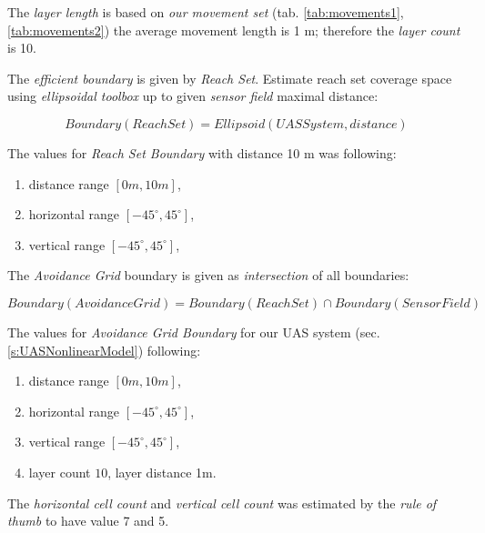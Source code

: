 \noindent The \emph{layer length} is based on \emph{our movement set} (tab. \ref{tab:movements1}, \ref{tab:movements2}) the average movement length is 1 m; therefore the \emph{layer count} is 10.

\noindent The \emph{efficient boundary} is given by  \emph{Reach Set}. Estimate reach set coverage space using \emph{ellipsoidal toolbox} \cite{kurzhanskiy2006ellipsoidal} up to given \emph{sensor field} maximal distance:

\begin{equation}
    Boundary(Reach Set) = Ellipsoid(UAS System,distance)
\end{equation}

The values for \emph{Reach Set Boundary} with distance 10 m was following:
\begin{enumerate}
    \item distance range $[0m,10m]$,
    \item horizontal range $[-45^\circ,45^\circ]$,
    \item vertical range $[-45^\circ,45^\circ]$,
\end{enumerate}

\noindent The \emph{Avoidance Grid} boundary is given as \emph{intersection} of all boundaries:

\begin{equation}
    Boundary(Avoidance Grid) =  Boundary(Reach Set) \cap Boundary(Sensor Field)
\end{equation}

\noindent The values for \emph{Avoidance Grid Boundary} for our UAS system (sec. \ref{s:UASNonlinearModel}) following:
\begin{enumerate}
    \item distance range $[0m,10m]$,
    \item horizontal range $[-45^\circ,45^\circ]$,
    \item vertical range $[-45^\circ,45^\circ]$,
    \item layer count $10$, layer distance 1m.
\end{enumerate}

The \emph{horizontal cell count} and \emph{vertical cell count} was estimated by the  \emph{rule of thumb} to have value 7 and 5.

